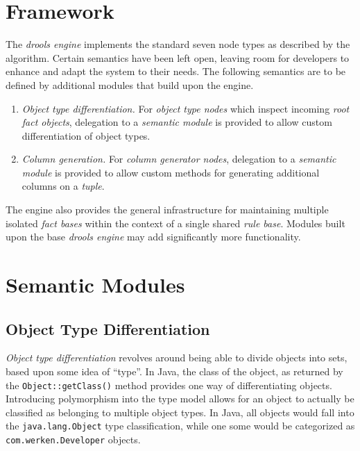 \documentclass[10pt,twocolumn,letterpaper]{article}
\begin{document}
\section{Framework}

The \emph{drools engine} implements the standard seven node types
as described by the algorithm.  Certain semantics have been left
open, leaving room for developers to enhance and adapt the system
to their needs.  The following semantics are to be defined by
additional modules that build upon the engine.

\begin{enumerate}

	\item \emph{Object type differentiation.} For \emph{object type
	nodes} which inspect incoming \emph{root fact objects}, delegation
	to a \emph{semantic module} is provided to allow custom differentiation of object
	types.

	\item \emph{Column generation.} For \emph{column generator nodes},
	delegation to a \emph{semantic module} is provided to allow custom methods for
	generating additional columns on a \emph{tuple}.

\end{enumerate}

The engine also provides the general infrastructure for maintaining
multiple isolated \emph{fact bases} within the context of a single
shared \emph{rule base}.  Modules built upon the base \emph{drools
engine} may add significantly more functionality.


\section{Semantic Modules}

\subsection{Object Type Differentiation}

\emph{Object type differentiation} revolves around being able
to divide objects into sets, based upon some idea of ``type''.  In 
Java, the class of the object, as returned by the
\verb|Object::getClass()| method provides one way of differentiating
objects.  Introducing polymorphism into the type model allows for
an object to actually be classified as belonging to multiple object
types.  In Java, all objects would fall into the
\verb|java.lang.Object| type classification, while one some would
be categorized as \verb|com.werken.Developer| objects.
\end{document}
